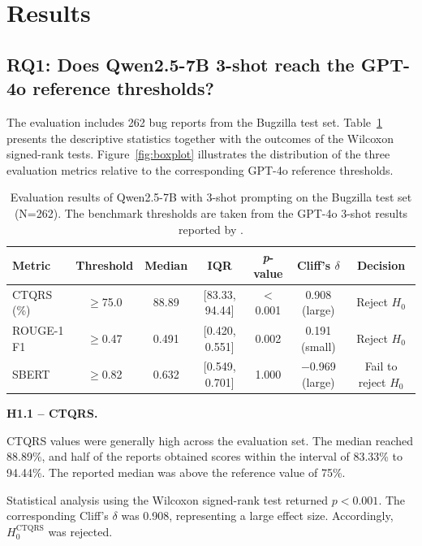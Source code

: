
\section{Results}
\label{sec:results}

\subsection*{RQ1: Does Qwen2.5-7B 3-shot reach the GPT-4o reference thresholds?}

The evaluation includes 262 bug reports from the Bugzilla test
set. Table~\ref{tab:results} presents the descriptive
statistics together with the outcomes of the Wilcoxon
signed-rank tests. Figure~\ref{fig:boxplot} illustrates the
distribution of the three evaluation metrics relative to the
corresponding GPT-4o reference thresholds.

\begin{table}[t]
\centering
\caption{Evaluation results of Qwen2.5-7B with 3-shot prompting
on the Bugzilla test set (N=262). The benchmark thresholds are
taken from the GPT-4o 3-shot results reported by
\protect\cite{acharya2025bugquality}.}
\label{tab:results}
\begin{tabular}{lcccccc}
\toprule
\textbf{Metric} &
\textbf{Threshold} &
\textbf{Median} &
\textbf{IQR} &
\textbf{\textit{p}-value} &
\textbf{Cliff's $\delta$} &
\textbf{Decision} \\
\midrule
CTQRS (\%) &
$\geq$75.0 &
88.89 &
[83.33, 94.44] &
$<$0.001 &
0.908 (large) &
Reject $H_0$ \\

ROUGE-1 F1 &
$\geq$0.47 &
0.491 &
[0.420, 0.551] &
0.002 &
0.191 (small) &
Reject $H_0$ \\

SBERT &
$\geq$0.82 &
0.632 &
[0.549, 0.701] &
1.000 &
$-$0.969 (large) &
Fail to reject $H_0$ \\
\bottomrule
\end{tabular}
\end{table}

\textbf{H1.1 -- CTQRS.}

CTQRS values were generally high across the evaluation set.
The median reached 88.89\%, and half of the reports obtained
scores within the interval of 83.33\% to 94.44\%. The reported
median was above the reference value of 75\%.

Statistical analysis using the Wilcoxon signed-rank test
returned $p<0.001$. The corresponding Cliff's $\delta$
was 0.908, representing a large effect size.
Accordingly, $H_0^{\text{CTQRS}}$ was rejected.

